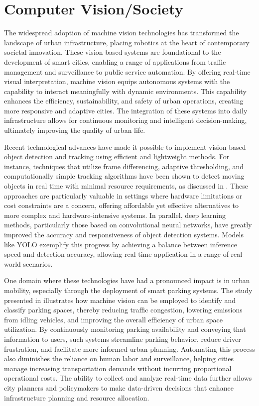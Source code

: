 \documentclass[conference]{IEEEtran}
\begin{document}
\section{Computer Vision/Society}

The widespread adoption of machine vision technologies has transformed the landscape of urban infrastructure, placing robotics at the heart of contemporary societal innovation. 
These vision-based systems are foundational to the development of smart cities, 
enabling a range of applications from traffic management and surveillance to public service automation. 
By offering real-time visual interpretation, 
machine vision equips autonomous systems with the capability to interact meaningfully with dynamic environments. 
This capability enhances the efficiency, 
sustainability, 
and safety of urban operations, 
creating more responsive and adaptive cities. 
The integration of these systems into daily infrastructure allows for continuous monitoring and intelligent decision-making, 
ultimately improving the quality of urban life.

Recent technological advances have made it possible to implement vision-based object detection and tracking using efficient and lightweight methods. 
For instance, 
techniques that utilize frame differencing, 
adaptive thresholding, 
and computationally simple tracking algorithms have been shown to detect moving objects in real time with minimal resource requirements, 
as discussed in \cite{wang_and_zhang}. 
These approaches are particularly valuable in settings where hardware limitations or cost constraints are a concern, 
offering affordable yet effective alternatives to more complex and hardware-intensive systems. 
In parallel, 
deep learning methods, 
particularly those based on convolutional neural networks, 
have greatly improved the accuracy and responsiveness of object detection systems. 
Models like YOLO exemplify this progress by achieving a balance between inference speed and detection accuracy, allowing real-time application in a range of real-world scenarios.

One domain where these technologies have had a pronounced impact is in urban mobility, 
especially through the deployment of smart parking systems. 
The study presented in \cite{smart_parking} 
illustrates how machine vision can be employed to identify and classify parking spaces, 
thereby reducing traffic congestion, 
lowering emissions from idling vehicles, 
and improving the overall efficiency of urban space utilization. 
By continuously monitoring parking availability and conveying that information to users, 
such systems streamline parking behavior, 
reduce driver frustration, 
and facilitate more informed urban planning. 
Automating this process also diminishes the reliance on human labor and surveillance, 
helping cities manage increasing transportation demands without incurring proportional operational costs. 
The ability to collect and analyze real-time data further allows city planners and policymakers to make data-driven decisions that enhance infrastructure planning and resource allocation.
\end{document}
